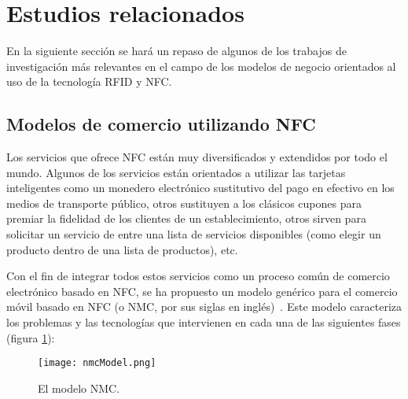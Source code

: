   \section{Estudios relacionados}
  \label{subsec:related}
En la siguiente sección se hará un repaso de algunos de los trabajos de
investigación más relevantes en el campo de los modelos de negocio orientados
al uso de la tecnología \acs{RFID} y \acs{NFC}.

    \subsection{Modelos de comercio utilizando NFC}
  Los servicios que ofrece \acs{NFC} están muy diversificados y extendidos
  por todo el mundo. Algunos de los servicios están orientados a utilizar
  las tarjetas inteligentes como un monedero electrónico sustitutivo del
  pago en efectivo en los medios de transporte público, otros sustituyen
  a los clásicos cupones para premiar la fidelidad de los clientes de un
  establecimiento, otros sirven para solicitar un servicio de entre una
  lista de servicios disponibles (como elegir un producto dentro de una
  lista de productos), etc.

  Con el fin de integrar todos estos servicios como un proceso común de
  comercio electrónico basado en NFC, se ha propuesto un modelo genérico
  para el comercio móvil basado en \acs{NFC} (o \acs{NMC}, por sus siglas
  en inglés)~\cite{bib:nfcCommerce}. Este modelo caracteriza los problemas y
  las tecnologías que intervienen en cada una de las siguientes fases
  (figura \ref{fig:nmcModel}):

  \begin{figure}[!h]
    \begin{center}
      \texttt{[image: nmcModel.png]}
      \caption{El modelo \acs{NMC}.}
      \label{fig:nmcModel}
    \end{center}
  \end{figure}

